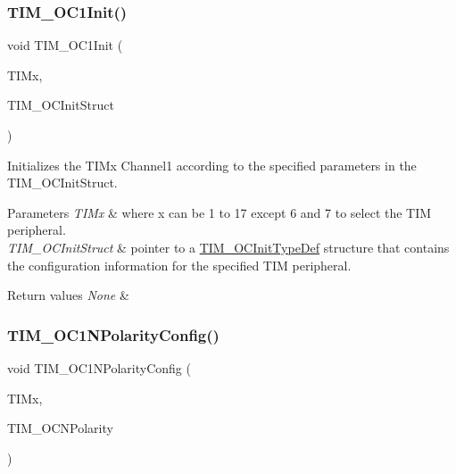 \subsubsection{\texorpdfstring{TIM\_OC1Init()}{TIM\_OC1Init()}}
{\footnotesize\ttfamily void T\+I\+M\+\_\+\+O\+C1\+Init (\begin{DoxyParamCaption}\item[{\mbox{\hyperlink{struct_t_i_m___type_def}{T\+I\+M\+\_\+\+Type\+Def}} $\ast$}]{T\+I\+Mx,  }\item[{\mbox{\hyperlink{struct_t_i_m___o_c_init_type_def}{T\+I\+M\+\_\+\+O\+C\+Init\+Type\+Def}} $\ast$}]{T\+I\+M\+\_\+\+O\+C\+Init\+Struct }\end{DoxyParamCaption})}



Initializes the T\+I\+Mx Channel1 according to the specified parameters in the T\+I\+M\+\_\+\+O\+C\+Init\+Struct. 


\begin{DoxyParams}{Parameters}
{\em T\+I\+Mx} & where x can be 1 to 17 except 6 and 7 to select the T\+IM peripheral. \\
\hline
{\em T\+I\+M\+\_\+\+O\+C\+Init\+Struct} & pointer to a \mbox{\hyperlink{struct_t_i_m___o_c_init_type_def}{T\+I\+M\+\_\+\+O\+C\+Init\+Type\+Def}} structure that contains the configuration information for the specified T\+IM peripheral. \\
\hline
\end{DoxyParams}

\begin{DoxyRetVals}{Return values}
{\em None} & \\
\hline
\end{DoxyRetVals}
\mbox{\label{group___t_i_m___private___functions_ga3cb91578e7dd34ea7d09862482960445}} 
\subsubsection{\texorpdfstring{TIM\_OC1NPolarityConfig()}{TIM\_OC1NPolarityConfig()}}
{\footnotesize\ttfamily void T\+I\+M\+\_\+\+O\+C1\+N\+Polarity\+Config (\begin{DoxyParamCaption}\item[{\mbox{\hyperlink{struct_t_i_m___type_def}{T\+I\+M\+\_\+\+Type\+Def}} $\ast$}]{T\+I\+Mx,  }\item[{uint16\+\_\+t}]{T\+I\+M\+\_\+\+O\+C\+N\+Polarity }\end{DoxyParamCaption})}



